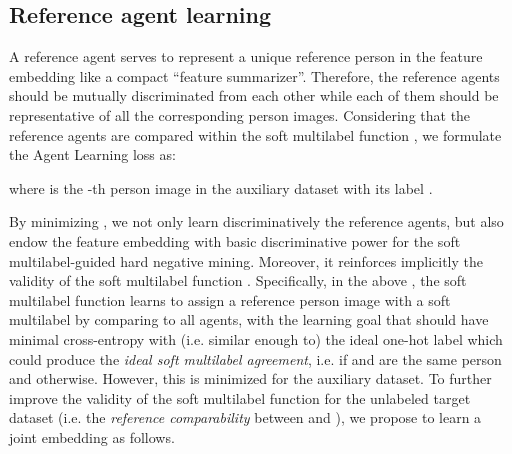 \documentclass[10pt,twocolumn,letterpaper]{article}
\newcommand{\Koven}{\color{black}}
\begin{document}
\subsection{Reference agent learning}\label{sec:aj}

A reference agent serves to represent a unique reference person
in the feature embedding like a compact ``feature summarizer''.
Therefore, the reference agents should be mutually discriminated from each other
while each of them should be representative of all the corresponding person images.
Considering that the reference agents are compared within the soft multilabel function ,
we formulate the Agent Learning loss as:
{\small

}where  is the -th person image in the auxiliary dataset with its label .

By minimizing ,
we not only learn discriminatively the reference agents,
{\Koven but also endow the feature embedding with basic discriminative power
for the soft multilabel-guided hard negative mining.
Moreover, it reinforces implicitly the validity of the soft multilabel function .
Specifically, in the above , the soft multilabel function
learns to assign a reference person image  with a soft multilabel 
by comparing  to all agents,
with the learning goal that  should have minimal cross-entropy with (i.e. similar enough to) the ideal one-hot label  which could produce the \emph{ideal soft multilabel agreement},
i.e.  if  and  are the same person and  otherwise.
However, this  is minimized for the auxiliary dataset.
To further improve the validity of the soft multilabel function for the unlabeled target dataset
(i.e. the \emph{reference comparability} between  and ), we propose to learn a joint embedding as follows.
}
\end{document}
